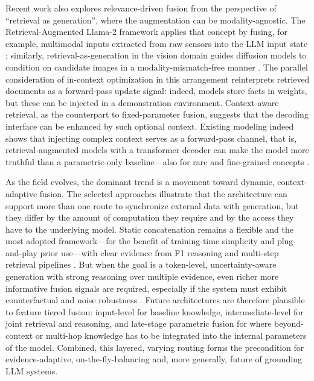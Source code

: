 \documentclass[11pt,a4paper]{article}
\begin{document}
Recent work also explores relevance-driven fusion from the perspective of ``retrieval as generation'', where the augmentation can be modality-agnostic. The Retrieval-Augmented Llama-2 framework applies that concept by fusing, for example, multimodal inputs extracted from raw sensors into the LLM input state \cite{arxiv:2503.07670v1}; similarly, retrieval-as-generation in the vision domain guides diffusion models to condition on candidate images in a modality-mismatch-free manner \cite{arxiv:2502.09411v2,arxiv:2503.18016v1}. The parallel consideration of in-context optimization in this arrangement reinterprets retrieved documents as a forward-pass update signal: indeed, models store facts in weights, but these can be injected in a demonstration environment. Context-aware retrieval, as the counterpart to fixed-parameter fusion, suggests that the decoding interface can be enhanced by such optional context. Existing modeling indeed shows that injecting complex context serves as a forward-pass channel, that is, retrieval-augmented models with a transformer decoder can make the model more truthful than a parametric-only baseline---also for rare and fine-grained concepts \cite{arxiv:2005.11401v4,arxiv:2502.09411v2}.

As the field evolves, the dominant trend is a movement toward dynamic, context-adaptive fusion. The selected approaches illustrate that the architecture can support more than one route to synchronize external data with generation, but they differ by the amount of computation they require and by the access they have to the underlying model. Static concatenation remains a flexible and the most adopted framework---for the benefit of training-time simplicity and plug-and-play prior use---with clear evidence from F1 reasoning and multi-step retrieval pipelines \cite{arxiv:2508.06401v3,arxiv:2508.06401v3}. But when the goal is a token-level, uncertainty-aware generation with strong reasoning over multiple evidence, even richer more informative fusion signals are required, especially if the system must exhibit counterfactual and noise robustness \cite{arxiv:2309.01431v2}. Future architectures are therefore plausible to feature tiered fusion: input-level for baseline knowledge, intermediate-level for joint retrieval and reasoning, and late-stage parametric fusion for where beyond-context or multi-hop knowledge has to be integrated into the internal parameters of the model. Combined, this layered, varying routing forms the precondition for evidence-adaptive, on-the-fly-balancing and, more generally, future of grounding LLM systems.
\end{document}
